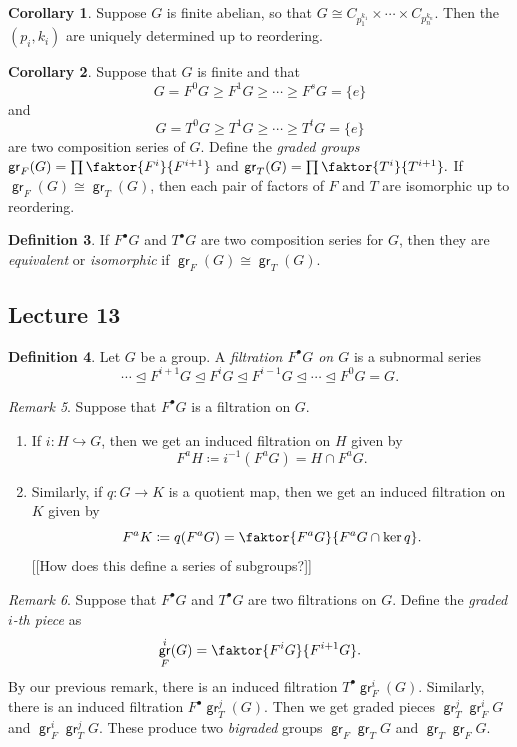 \documentclass[10pt,letterpaper,cm]{nupset}
\theoremstyle{definition}
\newtheorem{definition}{Definition}[subsection]
\theoremstyle{theorem}
\newtheorem{corollary}[definition]{Corollary}
\theoremstyle{remark}
\newtheorem{remark}[definition]{Remark}
\newcommand{\1}{\mathbf{1}}
\newcommand{\0}{\vec 0}
\DeclareMathOperator{\gr}{\mathsf{gr}}
\begin{document}
\begin{corollary}
Suppose $G$ is finite abelian, so that $G \cong C_{p_1^{k_1}} \times \cdots \times C_{p_n^{k_n}}$. Then the $(p_i, k_i)$ are uniquely determined up to reordering.
\end{corollary}

\begin{corollary}
Suppose that $G$ is finite and that $$ G = F^0G \geq F^1G \geq \cdots \geq F^sG = \{e\}  $$ and $$G = T^0G \geq T^1G \geq \cdots \geq T^tG = \{e\}$$ are two composition series of $G$. Define the \textit{graded groups} $\gr_F(G) = \prod \faktor{F^i}{F^{i+1}}$ and $\gr_T(G) = \prod \faktor{T^i}{T^{i+1}}.$ If $\gr_F(G) \cong \gr_T(G)$, then each pair of factors of $F$ and $T$ are isomorphic up to reordering. 
\end{corollary}

\begin{definition}
If $F^{\bullet}G$ and $T^{\bullet}G$ are two composition series for $G$, then they are \textit{equivalent} or \textit{isomorphic} if $\gr_F(G) \cong \gr_T(G)$.
\end{definition}

\subsection{Lecture 13}

\begin{definition}
Let $G$ be a group. A \textit{filtration $F^{\bullet}{G}$ on $G$} is a subnormal series
\[
\cdots \unlhd F^{i+1}{G} \unlhd F^i{G} \unlhd F^{i-1}{G} \unlhd \cdots \unlhd F^0{G} = G
.\]
\end{definition}

\begin{remark} Suppose that $F^{\bullet}G$ is a filtration on $G$.
\begin{enumerate}
\item If $i : H \hookrightarrow G$, then we get an induced filtration on $H$ given by $$F^a{H}\coloneqq  i^{-1}(F^aG) = H \cap F^a{G}.$$
\item Similarly, if $q: G \to K$ is a quotient map, then we get an induced filtration on $K$ given by $$F^aK\coloneqq  q(F^aG) = \faktor{F^aG}{F^aG \cap \ker q}.$$ {[[How does this define a series of subgroups?]]}
\end{enumerate}
\end{remark}

\begin{remark}
Suppose that $F^{\bullet}G$ and $T^{\bullet}G$ are two filtrations on $G$. Define the \textit{graded $i$-th piece} as $$\gr_F^i(G) = \faktor{F^iG}{F^{i+1}G}.$$ By our previous remark, there is an induced filtration $T^{\bullet}\gr_F^i(G)$. Similarly, there is an induced filtration $F^{\bullet}\gr_T^j(G)$. Then we get graded pieces $\gr_T^j\gr_F^iG$ and $\gr_F^i \gr_T^j G$. These produce two \textit{bigraded} groups $\gr_F\gr_TG$ and $\gr_T\gr_FG$.
\end{remark}
\end{document}
